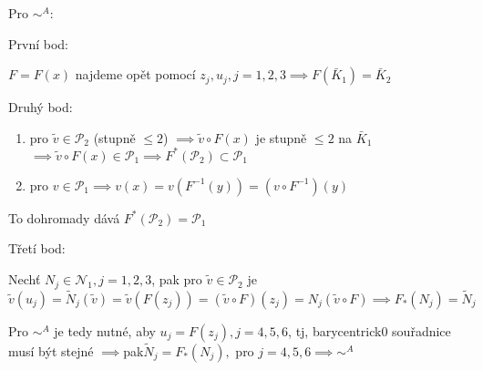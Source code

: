 \documentclass[../main.tex]{subfiles}
\begin{document}
\begin{example}
    Pro $\sim^A$:

    První bod:

    $F = F(x)$ najdeme opět pomocí $z_j, u_j, j=1,2,3 \implies F(\bar{K}_1) = \bar{K}_2$

    Druhý bod:

    \begin{enumerate}
        \item pro $\tilde{v} \in \mathcal{P}_2$ (stupně $\leq 2$) $\implies \tilde{v} \circ F(x)$ je stupně $\leq 2 $ na $\bar{K}_1$ $\implies \tilde{v} \circ F(x) \in \mathcal{P_1} \implies F^*(\mathcal{P}_2) \subset \mathcal{P}_1$
        \item pro $v\in\mathcal{P}_1 \implies v(x) = v(F^{-1}(y)) = (v\circ F^{-1})(y)$
    \end{enumerate} 
    To dohromady dává $F^* (\mathcal{P}_2) = \mathcal{P}_1$

    Třetí bod:

    Nechť $N_j \in \mathcal{N}_1, j=1,2,3$, pak pro $\tilde{v}\in\mathcal{P}_2$ je $\tilde{v}(u_j) = \tilde{N}_j(\tilde{v}) = \tilde{v}(F(z_j)) = (\tilde{v}\circ F )(z_j ) = N_j (\tilde{v}\circ F) \implies F_*(N_j) = \tilde{N}_j$

    Pro $\sim^A$ je tedy nutné, aby $u_j = F(z_j), j=4,5,6$, tj, barycentrick0 souřadnice musí být stejné $\implies $pak$ \tilde{N}_j = F_*(N_j),$ pro $j=4,5,6 \implies \sim^A$
    
\end{example}

\begin{example}


    
\end{example}
\end{document}
